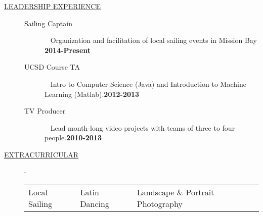 \documentclass{article}
\begin{document}
\begin{description}
    \item[\underline{LEADERSHIP EXPERIENCE}] \hfill
        \begin{description}
            \item[Sailing Captain] \textbullet ~ Organization and facilitation of local sailing events in Mission Bay \hfill \textbf{2014-Present}\\
            \item[UCSD Course TA]
                \textbullet ~ Intro to Computer Science (Java) and Introduction to Machine Learning (Matlab).\hfill \textbf{2012-2013}\\
            \item[TV Producer] \textbullet ~ Lead month-long video projects with teams of three to four people.\hfill \textbf{2010-2013}\\
        \end{description}

    \item[\underline{EXTRACURRICULAR}] -
        \begin{tabular}{l|l|l}
            Local Sailing & Latin Dancing & Landscape \& Portrait Photography
        \end{tabular}

\end{description}
\end{document}
